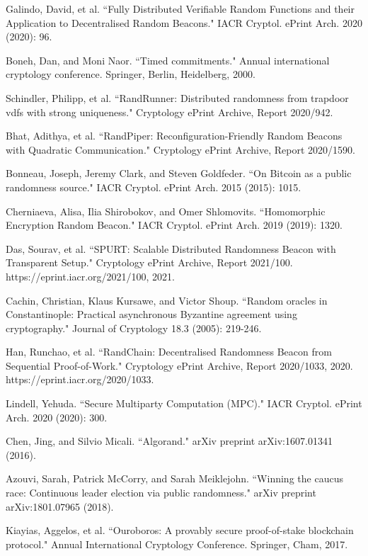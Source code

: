 \documentclass[11pt]{article}
\theoremstyle{definition}
\theoremstyle{remark}
\begin{document}
\begin{thebibliography}{50}
Galindo, David, et al. ``Fully Distributed Verifiable Random Functions and their Application to Decentralised Random Beacons." IACR Cryptol. ePrint Arch. 2020 (2020): 96.

Boneh, Dan, and Moni Naor. ``Timed commitments." Annual international cryptology conference. Springer, Berlin, Heidelberg, 2000.

Schindler, Philipp, et al. ``RandRunner: Distributed randomness from trapdoor vdfs with strong uniqueness." Cryptology ePrint Archive, Report 2020/942.

Bhat, Adithya, et al. ``RandPiper: Reconfiguration-Friendly Random Beacons with Quadratic Communication." Cryptology ePrint Archive, Report 2020/1590.

Bonneau, Joseph, Jeremy Clark, and Steven Goldfeder. ``On Bitcoin as a public randomness source." IACR Cryptol. ePrint Arch. 2015 (2015): 1015.

Cherniaeva, Alisa, Ilia Shirobokov, and Omer Shlomovits. ``Homomorphic Encryption Random Beacon." IACR Cryptol. ePrint Arch. 2019 (2019): 1320.

Das, Sourav, et al. ``SPURT: Scalable Distributed Randomness Beacon with Transparent Setup." Cryptology ePrint Archive, Report 2021/100. https://eprint.iacr.org/2021/100, 2021.

Cachin, Christian, Klaus Kursawe, and Victor Shoup. ``Random oracles in Constantinople: Practical asynchronous Byzantine agreement using cryptography." Journal of Cryptology 18.3 (2005): 219-246.

Han, Runchao, et al. ``RandChain: Decentralised Randomness Beacon from Sequential Proof-of-Work." Cryptology ePrint Archive, Report 2020/1033, 2020. https://eprint.iacr.org/2020/1033.

Lindell, Yehuda. ``Secure Multiparty Computation (MPC)." IACR Cryptol. ePrint Arch. 2020 (2020): 300.

Chen, Jing, and Silvio Micali. ``Algorand." arXiv preprint arXiv:1607.01341 (2016).

Azouvi, Sarah, Patrick McCorry, and Sarah Meiklejohn. ``Winning the caucus race: Continuous leader election via public randomness." arXiv preprint arXiv:1801.07965 (2018).

Kiayias, Aggelos, et al. ``Ouroboros: A provably secure proof-of-stake blockchain protocol." Annual International Cryptology Conference. Springer, Cham, 2017.


\end{thebibliography}
\end{document}
